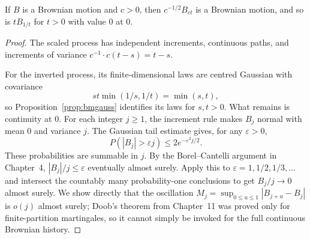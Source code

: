 \begin{proposition}[scaling]\label{prop:scaling}
If $B$ is a Brownian motion and $c>0$, then $c^{-1/2}B_{ct}$ is a Brownian motion, and so is $t B_{1/t}$ for $t>0$ with value $0$ at $0$.
\end{proposition}
\begin{proof}
The scaled process has independent increments, continuous paths, and increments of variance $c^{-1}\cdot c(t-s)=t-s$.

For the inverted process, its finite-dimensional laws are centred Gaussian with covariance
\[
 st\min(1/s,1/t)=\min(s,t),
\]
so Proposition~\ref{prop:bmgauss} identifies its laws for $s,t>0$. What remains is continuity at $0$. For each integer $j\ge1$, the increment rule makes $B_j$ normal with mean $0$ and variance $j$. The Gaussian tail estimate gives, for any $\varepsilon>0$,
\[
 P(|B_j|>\varepsilon j)\le2e^{-\varepsilon^2j/2}.
\]
These probabilities are summable in $j$. By the Borel--Cantelli argument in Chapter~4, $|B_j|/j\le\varepsilon$ eventually almost surely. Apply this to $\varepsilon=1,1/2,1/3,\ldots$ and intersect the countably many probability-one conclusions to get $B_j/j\to0$ almost surely. We show directly that the oscillation $M_j=\sup_{0\le u\le1}|B_{j+u}-B_j|$ is $o(j)$ almost surely; Doob's theorem from Chapter~11 was proved only for finite-partition martingales, so it cannot simply be invoked for the full continuous Brownian history.


\end{proof}
